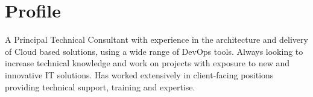 \section{Profile}

A Principal Technical Consultant with experience in the architecture 
and delivery of Cloud based solutions, using a wide 
range of DevOps tools. Always looking to increase technical 
knowledge and work on projects with exposure to new and innovative 
IT solutions. Has worked extensively in client-facing positions 
providing technical support, training and expertise.

\closesection{}
